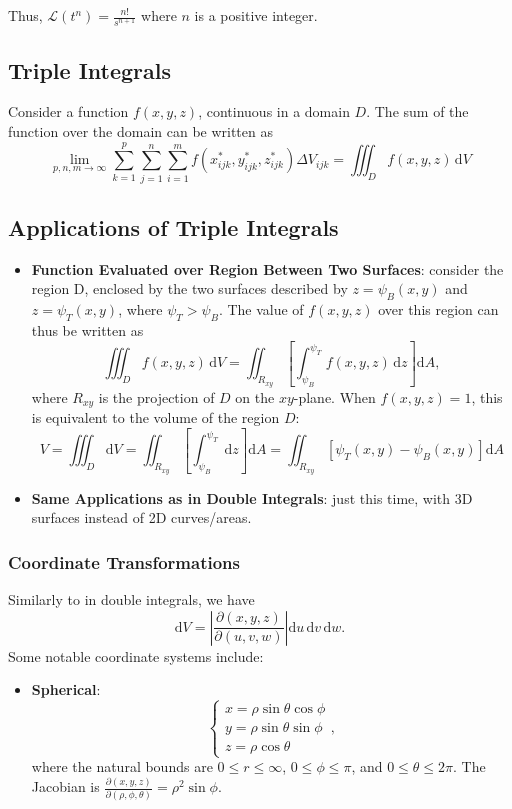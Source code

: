 \documentclass[12pt]{article}
\begin{document}
{Thus, $\mathcal{L}(t^n) = \frac{n!}{s^{n+1}}$ where $n$ is a positive integer.
\subsection{Triple Integrals}

Consider a function $f(x,y,z)$, continuous in a domain $D$. The sum of the function over the domain can be written as \[\lim_{p,n,m \to \infty} \sum_{k=1}^p \sum_{j=1}^n \sum_{i=1}^m f(x_{ijk}^*, y_{ijk}^*, z_{ijk}^*) \Delta V_{ijk} = \iiint_D f(x,y,z) \,\text{d}V\]


\subsection{Applications of Triple Integrals}
\begin{itemize}
    \item \textbf{Function Evaluated over Region Between Two Surfaces}: consider the region D, enclosed by the two surfaces described by $z = \psi_B(x,y)$ and $z = \psi_T(x,y)$, where $\psi_T > \psi_B$. The value of $f(x,y,z)$ over this region can thus be written as \[\iiint_D f(x,y,z) \,\text{d}V = \iint_{R_{xy}} \left[\int_{\psi_B}^{\psi_T} f(x,y,z) \, \text{d}z\right]\text{d}A,\] where $R_{xy}$ is the projection of $D$ on the $xy$-plane. When $f(x,y,z) = 1$, this is equivalent to the volume of the region $D$: \[V = \iiint_D \text{d}V = \iint_{R_{xy}}\left[\int_{\psi_B}^{\psi_T} \,\text{d}z\right] \text{d}A = \iint_{R_{xy}}\left[\psi_T(x,y) - \psi_B(x,y)\right]\text{d}A\]
    \item \textbf{Same Applications as in Double Integrals}: just this time, with 3D surfaces instead of 2D curves/areas.
\end{itemize}

\subsubsection{Coordinate Transformations}

Similarly to in double integrals, we have \[\text{d}V = \left|\frac{\partial(x,y,z)}{\partial(u,v,w)}\right| \text{d}u\, \text{d}v\, \text{d}w.\] Some notable coordinate systems include: \begin{itemize}
    \item \textbf{Spherical}: \[\begin{cases}
        x = \rho\sin\theta\cos\phi\\
        y = \rho\sin\theta\sin\phi\\
        z = \rho\cos\theta
    \end{cases},\] where the natural bounds are $0 \leq r \leq \infty$, $0 \leq \phi \leq \pi$, and $0 \leq \theta \leq 2\pi$. The Jacobian is $\frac{\partial(x,y,z)}{\partial(\rho, \phi, \theta)} = \rho^2\sin \phi$.


\end{itemize}}
\end{document}
